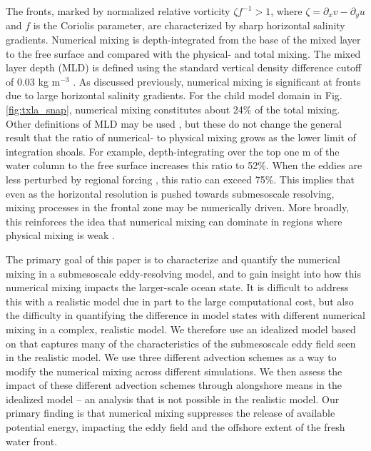 The fronts, marked by normalized relative vorticity $\zeta f^{-1} > 1$, where $\zeta = \partial_x v - \partial_y u$ and $f$ is the Coriolis parameter, are characterized by sharp horizontal salinity gradients. Numerical mixing is depth-integrated from the base of the mixed layer to the free surface and compared with the physical- and total mixing. The mixed layer depth (MLD) is defined using the standard vertical density difference cutoff of 0.03 kg m$^{-3}$ \citep{de2004mixed}. As discussed previously, numerical mixing is significant at fronts due to large horizontal salinity gradients. For the child model domain in Fig. \ref{fig:txla_snap}, numerical mixing constitutes about 24\% of the total mixing. Other definitions of MLD may be used \cite[see][]{thomson2003estimating}, but these do not change the general result that the ratio of numerical- to physical mixing grows as the lower limit of integration shoals. For example, depth-integrating over the top one m of the water column to the free surface increases this ratio to 52\%. When the eddies are less perturbed by regional forcing \citep[e.g., Fig. 2 of][]{Schlichting23}, this ratio can exceed 75\%. This implies that even as the horizontal resolution is pushed towards submesoscale resolving, mixing processes in the frontal zone may be numerically driven. More broadly, this reinforces the idea that numerical mixing can dominate in regions where physical mixing is weak \citep{Kalra_2019, Wang_2021}.

The primary goal of this paper is to characterize and quantify the numerical mixing in a submesoscale eddy-resolving model, and to gain insight into how this numerical mixing impacts the larger-scale ocean state. It is difficult to address this with a realistic model due in part to the large computational cost, but also the difficulty in quantifying the difference in model states with different numerical mixing in a complex, realistic model. We therefore use an idealized model based on \citet{Hetland_2017} that captures many of the characteristics of the submesoscale eddy field seen in the realistic model. We use three different advection schemes as a way to modify the numerical mixing across different simulations. We then assess the impact of these different advection schemes through alongshore means in the idealized model -- an analysis that is not possible in the realistic model. Our primary finding is that numerical mixing suppresses the release of available potential energy, impacting the eddy field and the offshore extent of the fresh water front.


